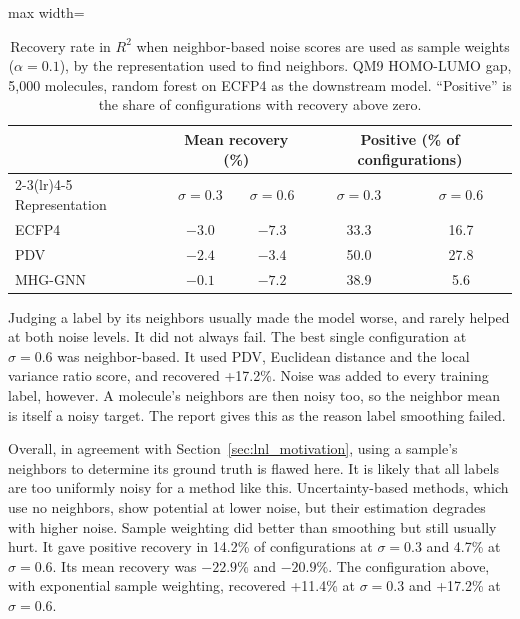 \begin{table}[htbp]
\centering
\caption[Recovery in $R^2$ with neighbor-based sample weights, by representation.]{Recovery rate in $R^2$ when neighbor-based noise scores are used as sample weights ($\alpha = 0.1$), by the representation used to find neighbors. QM9 HOMO-LUMO gap, 5,000 molecules, random forest on ECFP4 as the downstream model. ``Positive'' is the share of configurations with recovery above zero.}
\label{tab:code_input_neighbor_recovery}
\begin{adjustbox}{max width=\textwidth}
\begin{tabular}{lcccc}
\toprule
 & \multicolumn{2}{c}{Mean recovery (\%)} & \multicolumn{2}{c}{Positive (\% of configurations)} \\
\cmidrule(lr){2-3}\cmidrule(lr){4-5}
Representation & $\sigma = 0.3$ & $\sigma = 0.6$ & $\sigma = 0.3$ & $\sigma = 0.6$ \\
\midrule
ECFP4   & $-3.0$ & $-7.3$ & 33.3 & 16.7 \\
PDV     & $-2.4$ & $-3.4$ & 50.0 & 27.8 \\
MHG-GNN & $-0.1$ & $-7.2$ & 38.9 & 5.6 \\
\bottomrule
\end{tabular}
\end{adjustbox}
\end{table}

Judging a label by its neighbors usually made the model worse, and rarely helped at both noise levels. It did not always fail. The best single configuration at $\sigma = 0.6$ was neighbor-based. It used PDV, Euclidean distance and the local variance ratio score, and recovered +17.2\%. Noise was added to every training label, however. A molecule's neighbors are then noisy too, so the neighbor mean is itself a noisy target. The report gives this as the reason label smoothing failed.

Overall, in agreement with Section~\ref{sec:lnl_motivation}, using a sample's neighbors to determine its ground truth is flawed here. It is likely that all labels are too uniformly noisy for a method like this. Uncertainty-based methods, which use no neighbors, show potential at lower noise, but their estimation degrades with higher noise. Sample weighting did better than smoothing but still usually hurt. It gave positive recovery in 14.2\% of configurations at $\sigma = 0.3$ and 4.7\% at $\sigma = 0.6$. Its mean recovery was $-22.9\%$ and $-20.9\%$. The configuration above, with exponential sample weighting, recovered +11.4\% at $\sigma = 0.3$ and +17.2\% at $\sigma = 0.6$.

